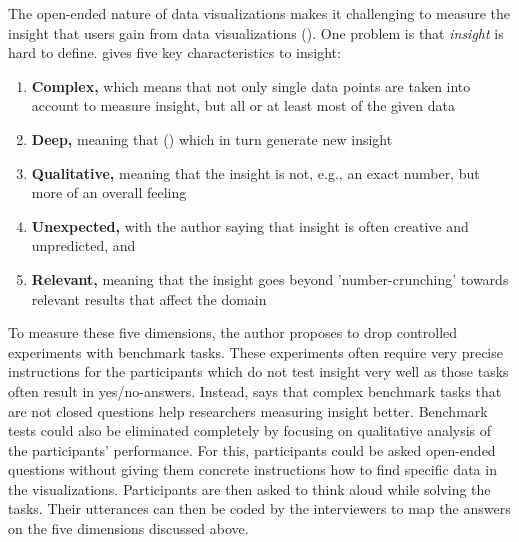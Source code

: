 The open-ended nature of data visualizations makes it challenging to measure the insight that users gain from data visualizations (\cite{northMeasuringVisualizationInsight2006}). One problem is that \emph{insight} is hard to define. \citeauthor{northMeasuringVisualizationInsight2006} gives five key characteristics to insight:
\begin{enumerate}
    \item \textbf{Complex,} which means that not only single data points are taken into account to measure insight, but all or at least most of the given data
    \item \textbf{Deep,} meaning that  (\cite[6]{northMeasuringVisualizationInsight2006}) which in turn generate new insight
    \item \textbf{Qualitative,} meaning that the insight is not, e.g., an exact number, but more of an overall feeling
    \item \textbf{Unexpected,} with the author saying that insight is often creative and unpredicted, and
    \item \textbf{Relevant,} meaning that the insight goes beyond 'number-crunching' towards relevant results that affect the domain
\end{enumerate}
To measure these five dimensions, the author proposes to drop controlled experiments with benchmark tasks. These experiments often require very precise instructions for the participants which do not test insight very well as those tasks often result in yes/no-answers. Instead, \citeauthor{northMeasuringVisualizationInsight2006} says that complex benchmark tasks that are not closed questions help researchers measuring insight better. Benchmark tests could also be eliminated completely by focusing on qualitative analysis of the participants' performance. For this, participants could be asked open-ended questions without giving them concrete instructions how to find specific data in the visualizations. Participants are then asked to think aloud while solving the tasks. Their utterances can then be coded by the interviewers to map the answers on the five dimensions discussed above.
